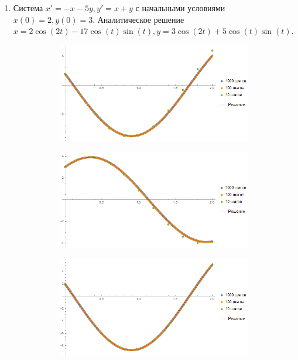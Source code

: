\documentclass[a4paper,12pt,titlepage,finall]{article}
\begin{document}
\begin{enumerate}
\newpage
\item
Система $x' = -x -5y, y' = x + y$ с начальными условиями $x(0) = 2, y(0)= 3$. Аналитическое решение $x = 2 \cos (2 t) - 17 \cos (t) \sin(t), y = 3 \cos (2 t) + 5 \cos (t) \sin (t)$.
\begin{figure}[h]
\centering
\begin{subfigure}{.5\textwidth}
  \centering
  \includegraphics[width=\textwidth]{test_1_5_2_x.png}
\end{subfigure}%
\begin{subfigure}{.5\textwidth}
  \centering
  \includegraphics[width=\textwidth]{test_1_5_2_y.png}
\end{subfigure}
\caption{Второй порядок точности, графики $x(t)$ и $y(t)$ соответственно}
\centering
\begin{subfigure}{.5\textwidth}
  \centering
  \includegraphics[width=\textwidth]{test_1_5_4_x.png}

\end{subfigure}
\end{figure}
\end{enumerate}
\end{document}
